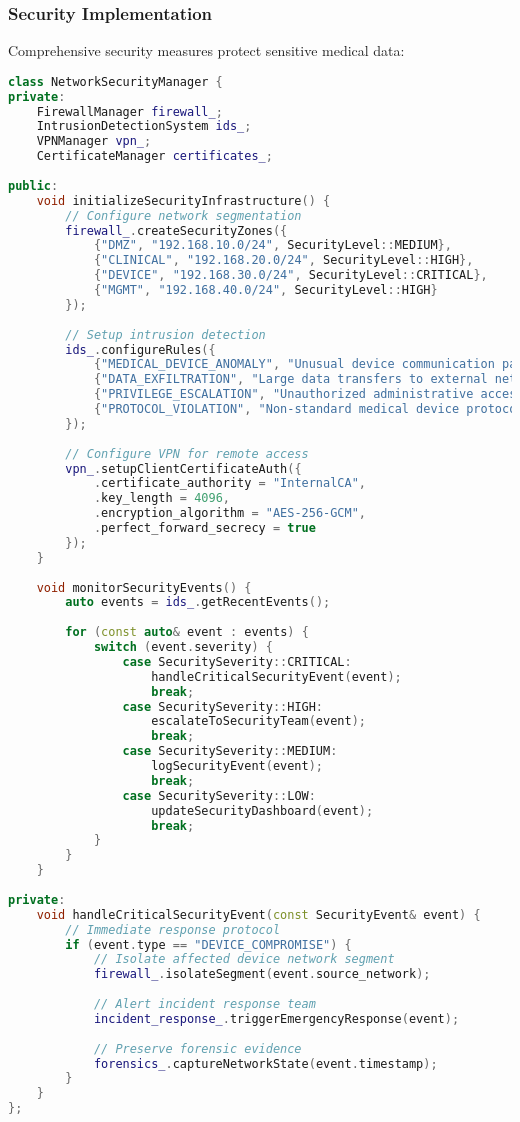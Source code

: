 \subsubsection{Security Implementation}
Comprehensive security measures protect sensitive medical data:

\begin{lstlisting}[language=C++, caption={Network Security Manager}, label={lst:network-security}]
class NetworkSecurityManager {
private:
    FirewallManager firewall_;
    IntrusionDetectionSystem ids_;
    VPNManager vpn_;
    CertificateManager certificates_;
    
public:
    void initializeSecurityInfrastructure() {
        // Configure network segmentation
        firewall_.createSecurityZones({
            {"DMZ", "192.168.10.0/24", SecurityLevel::MEDIUM},
            {"CLINICAL", "192.168.20.0/24", SecurityLevel::HIGH},
            {"DEVICE", "192.168.30.0/24", SecurityLevel::CRITICAL},
            {"MGMT", "192.168.40.0/24", SecurityLevel::HIGH}
        });
        
        // Setup intrusion detection
        ids_.configureRules({
            {"MEDICAL_DEVICE_ANOMALY", "Unusual device communication patterns"},
            {"DATA_EXFILTRATION", "Large data transfers to external networks"},
            {"PRIVILEGE_ESCALATION", "Unauthorized administrative access attempts"},
            {"PROTOCOL_VIOLATION", "Non-standard medical device protocols"}
        });
        
        // Configure VPN for remote access
        vpn_.setupClientCertificateAuth({
            .certificate_authority = "InternalCA",
            .key_length = 4096,
            .encryption_algorithm = "AES-256-GCM",
            .perfect_forward_secrecy = true
        });
    }
    
    void monitorSecurityEvents() {
        auto events = ids_.getRecentEvents();
        
        for (const auto& event : events) {
            switch (event.severity) {
                case SecuritySeverity::CRITICAL:
                    handleCriticalSecurityEvent(event);
                    break;
                case SecuritySeverity::HIGH:
                    escalateToSecurityTeam(event);
                    break;
                case SecuritySeverity::MEDIUM:
                    logSecurityEvent(event);
                    break;
                case SecuritySeverity::LOW:
                    updateSecurityDashboard(event);
                    break;
            }
        }
    }
    
private:
    void handleCriticalSecurityEvent(const SecurityEvent& event) {
        // Immediate response protocol
        if (event.type == "DEVICE_COMPROMISE") {
            // Isolate affected device network segment
            firewall_.isolateSegment(event.source_network);
            
            // Alert incident response team
            incident_response_.triggerEmergencyResponse(event);
            
            // Preserve forensic evidence
            forensics_.captureNetworkState(event.timestamp);
        }
    }
};
\end{lstlisting}

